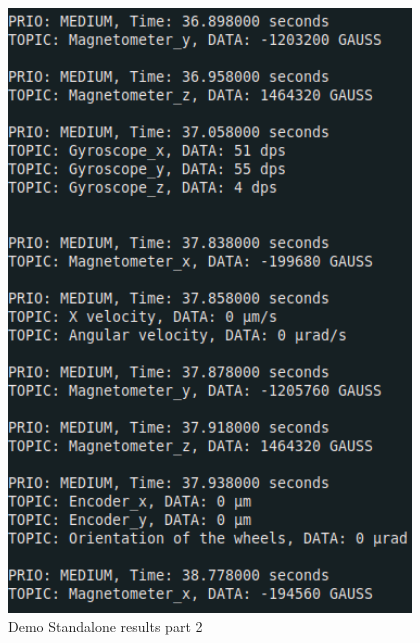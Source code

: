 \documentclass[12pt]{report}%
\begin{document}
\begin{figure}[ht]
	\centering
	\includegraphics[width=\textwidth, height=16cm]{standalone_2}
  	\caption{Demo Standalone results part 2}
  	\label{fig:res2}
\end{figure}
\end{document}
